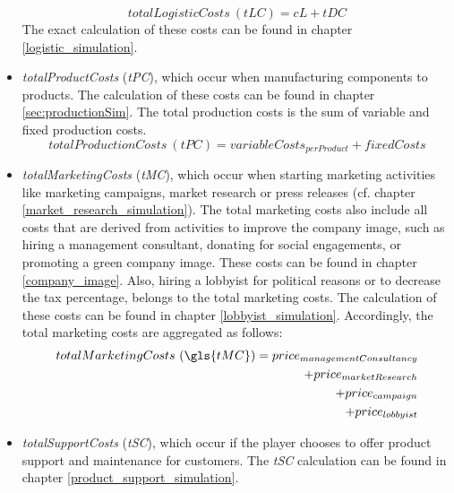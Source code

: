 \begin{itemize}
    \begin{equation} 
        totalLogisticCosts~(tLC) = cL + tDC
    \end{equation}
    The exact calculation of these costs can be found in chapter \ref{logistic_simulation}.
    \item \textit{totalProductCosts} (\textit{tPC}), which occur when manufacturing components to products. The calculation of these costs can be found in chapter \ref{sec:productionSim}. The total production costs is the sum of variable and fixed production costs.
   \begin{equation}
       totalProductionCosts~(tPC) = variableCosts_{perProduct} + fixedCosts
   \end{equation}
    \item \textit{totalMarketingCosts} (\textit{tMC}), which occur when starting marketing activities like marketing campaigns, market research or press releases (cf. chapter \ref{market_research_simulation}). The total marketing costs also include all costs that are derived from activities to improve the company image, such as hiring a management consultant, donating for social engagements, or promoting a green company image. These costs can be found in chapter \ref{company_image}. Also, hiring a lobbyist for political reasons or to decrease the tax percentage, belongs to the total marketing costs. The calculation of these costs can be found in chapter \ref{lobbyist_simulation}. Accordingly, the total marketing costs are aggregated as follows:
    \begin{equation}
    \begin{split}
        totalMarketingCosts~ (\gls{tMC}) = price_{managementConsultancy} \\
        + price_{marketResearch} \\
        + price_{campaign} \\
        + price_{lobbyist} \\
    \end{split}
    \end{equation}
    \item \textit{totalSupportCosts} (\textit{tSC}), which occur if the player chooses to offer product support and maintenance for customers. The \textit{tSC} calculation can be found in chapter \ref{product_support_simulation}.
\end{itemize}

